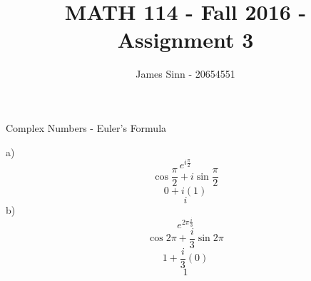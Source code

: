 \documentclass[12pt]{article}
\newenvironment{problem}[2][Problem]{\begin{trivlist}
\item[\hskip \labelsep {\bfseries #1}\hskip \labelsep {\bfseries #2.}]}{\end{trivlist}}
\begin{document}
 
 
\title{MATH 114 - Fall 2016 - Assignment 3}
\author{James Sinn - 20654551}
\maketitle
 

\begin{problem}{1}
	Complex Numbers - Euler's Formula
\end{problem}
a)\\
	\[e^{i\frac{\pi}{2}}\]
	\[\cos{\frac{\pi}{2}} + i \sin{\frac{\pi}{2}}\]
	\[0 + i (1)\]
	\[i\]
b)\\	
	\[e^{2\pi \frac{i}{3}}\]
	\[\cos{2\pi} + \frac{i}{3} \sin{2\pi}\]
	\[1 + \frac{i}{3} (0)\]
	\[1\]
\begin{problem}{2}

\end{problem}

\begin{problem}{3}
\end{problem}

\begin{problem}{4}

\end{problem}
\end{document}
